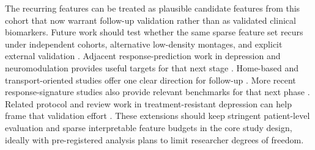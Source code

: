 The recurring features can be treated as plausible candidate features from this cohort that now warrant follow-up validation rather than as validated clinical biomarkers. Future work should test whether the same sparse feature set recurs under independent cohorts, alternative low-density montages, and explicit external validation \citep{Dagnino2023}. Adjacent response-prediction work in depression and neuromodulation provides useful targets for that next stage \citep{funk2008_prefrontal,bailey2023_concurrent,guo2024_restingstate}. Home-based and transport-oriented studies offer one clear direction for follow-up \citep{romeromarn2026_remotely,kratter2026_stanford,waller2026_transient}. More recent response-signature studies also provide relevant benchmarks for that next phase \citep{sheen2024_response,zeidabadi2025_prediction,reissmann2026_thetacordance}. Related protocol and review work in treatment-resistant depression can help frame that validation effort \citep{ulrich2025_alterations,pettorruso2024_overcoming}. These extensions should keep stringent patient-level evaluation and sparse interpretable feature budgets in the core study design, ideally with pre-registered analysis plans to limit researcher degrees of freedom.
